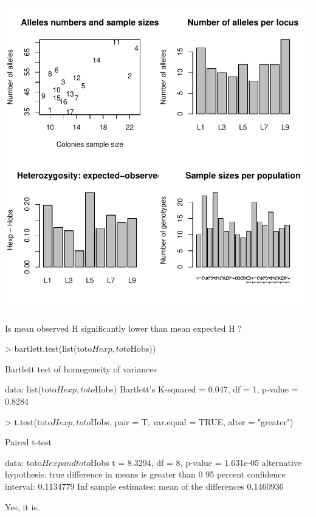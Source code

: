 \documentclass{article}
\begin{document}
\includegraphics{figs/base-sumry}

Is mean observed H significantly lower than mean expected H ?

\begin{Schunk}
\begin{Sinput}
> bartlett.test(list(toto$Hexp, toto$Hobs))
\end{Sinput}
\begin{Soutput}
	Bartlett test of homogeneity of variances

data:  list(toto$Hexp, toto$Hobs) 
Bartlett's K-squared = 0.047, df = 1, p-value = 0.8284
\end{Soutput}
\begin{Sinput}
> t.test(toto$Hexp, toto$Hobs, pair = T, var.equal = TRUE, alter = "greater")
\end{Sinput}
\begin{Soutput}
	Paired t-test

data:  toto$Hexp and toto$Hobs 
t = 8.3294, df = 8, p-value = 1.631e-05
alternative hypothesis: true difference in means is greater than 0 
95 percent confidence interval:
 0.1134779       Inf 
sample estimates:
mean of the differences 
              0.1460936 
\end{Soutput}
\end{Schunk}
Yes, it is.
\end{document}
